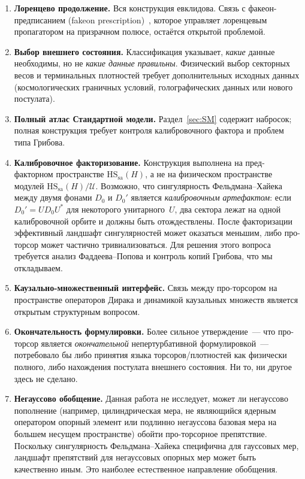 \documentclass[12pt,a4paper]{article}
\theoremstyle{plain}
\theoremstyle{definition}
\theoremstyle{remark}
\newcommand{\HS}{\mathrm{HS}}
\newcommand{\sa}{\mathrm{sa}}
\begin{document}
\begin{enumerate}[leftmargin=2em]
  \item \textbf{Лоренцево продолжение.} Вся конструкция евклидова. Связь с факеон-предписанием
    (fakeon prescription)~\cite{Anselmi:2018,Anselmi:2020}, которое
    управляет лоренцевым пропагатором на призрачном полюсе, остаётся
    открытой проблемой.

  \item \textbf{Выбор внешнего состояния.} Классификация указывает, \emph{какие} данные необходимы,
    но не \emph{какие данные правильны}.  Физический выбор секторных
    весов и терминальных плотностей требует дополнительных исходных данных
    (космологических граничных условий, голографических данных
    или нового постулата).

  \item \textbf{Полный атлас Стандартной модели.} Раздел~\ref{sec:SM} содержит набросок; полная конструкция
    требует контроля калибровочного фактора и проблем типа Грибова.

  \item \textbf{Калибровочное факторизование.} Конструкция выполнена на пред-факторном пространстве
    $\HS_\sa(H)$, а не на физическом пространстве модулей
    $\HS_\sa(H)/\mathcal{U}$.  Возможно, что
    сингулярность Фельдмана--Хайека между двумя фонами $D_0$ и
    $D_0'$ является \emph{калибровочным артефактом}: если
    $D_0' = U D_0 U^*$ для некоторого унитарного~$U$, два сектора
    лежат на одной калибровочной орбите и должны быть
    отождествлены.  После факторизации эффективный ландшафт
    сингулярностей может оказаться меньшим, либо про-торсор
    может частично тривиализоваться.  Для решения этого вопроса
    требуется анализ Фаддеева--Попова и контроль копий Грибова,
    что мы откладываем.

  \item \textbf{Каузально-множественный интерфейс.} Связь между
    про-торсором на пространстве операторов Дирака и динамикой
    каузальных множеств является открытым структурным вопросом.

  \item \textbf{Окончательность формулировки.} Более сильное утверждение~--- что про-торсор является
    \emph{окончательной} непертурбативной формулировкой~--- потребовало
    бы либо принятия языка торсоров/плотностей как физически полного,
    либо нахождения постулата внешнего состояния.  Ни то, ни другое
    здесь не сделано.

  \item \textbf{Негауссово обобщение.} Данная работа не исследует,
    может ли негауссово пополнение (например, цилиндрическая мера,
    не являющийся ядерным оператором опорный элемент или подлинно
    негауссова базовая мера на большем несущем пространстве) обойти
    про-торсорное препятствие.  Поскольку сингулярность
    Фельдмана--Хайека специфична для гауссовых мер, ландшафт
    препятствий для негауссовых опорных мер может быть качественно
    иным.  Это наиболее естественное направление обобщения.


\end{enumerate}
\end{document}
